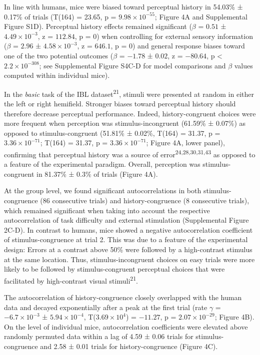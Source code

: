 \documentclass[
]{article}
\begin{document}
In line with humans, mice were biased toward perceptual history in
54.03\% ± 0.17\% of trials (T(164) = 23.65, p =
\(\ensuremath{9.98\times 10^{-55}}\); Figure 4A and Supplemental Figure
S1D). Perceptual history effects remained significant (\(\beta\) =
\(0.51\) ± \(\ensuremath{4.49\times 10^{-3}}\), z = \(112.84\), p =
\(0\)) when controlling for external sensory information (\(\beta\) =
\(2.96\) ± \(\ensuremath{4.58\times 10^{-3}}\), z = \(646.1\), p =
\(0\)) and general response biases toward one of the two potential
outcomes (\(\beta\) = \(-1.78\) ± \(0.02\), z = \(-80.64\), p < \(\ensuremath{2.2\times 10^{-308}}\);
see Supplemental Figure S4C-D for model comparisons and \(\beta\) values
computed within individual mice).

In the \emph{basic} task of the IBL dataset\textsuperscript{21}, stimuli
were presented at random in either the left or right hemifield. Stronger
biases toward perceptual history should therefore decrease perceptual
performance. Indeed, history-congruent choices were more frequent when
perception was stimulus-incongruent (61.59\% ± 0.07\%) as opposed to
stimulus-congruent (51.81\% ± 0.02\%, T(164) = 31.37, p =
\(\ensuremath{3.36\times 10^{-71}}\); T(164) = 31.37, p =
\(\ensuremath{3.36\times 10^{-71}}\); Figure 4A, lower panel),
confirming that perceptual history was a source of
error\textsuperscript{24,28,30,31,43} as opposed to a feature of the
experimental paradigm. Overall, perception was stimulus-congruent in
81.37\% ± 0.3\% of trials (Figure 4A).

At the group level, we found significant autocorrelations in both
stimulus-congruence (86 consecutive trials) and history-congruence (8
consecutive trials), which remained significant when taking into account
the respective autocorrelation of task difficulty and external
stimulation (Supplemental Figure 2C-D). In contrast to humans, mice
showed a negative autocorrelation coefficient of stimulus-congruence at
trial 2. This was due to a feature of the experimental design: Errors at
a contrast above 50\% were followed by a high-contrast stimulus at the
same location. Thus, stimulus-incongruent choices on easy trials were
more likely to be followed by stimulus-congruent perceptual choices that
were facilitated by high-contrast visual stimuli\textsuperscript{21}.

The autocorrelation of history-congruence closely overlapped with the
human data and decayed exponentially after a peak at the first trial
(rate \(\gamma\) = \(\ensuremath{-6.7\times 10^{-3}}\) ±
\(\ensuremath{5.94\times 10^{-4}}\),
T(\(\ensuremath{3.69\times 10^{4}}\)) = \(-11.27\), p =
\(\ensuremath{2.07\times 10^{-29}}\); Figure 4B). On the level of
individual mice, autocorrelation coefficients were elevated above
randomly permuted data within a lag of 4.59 ± 0.06 trials for
stimulus-congruence and 2.58 ± 0.01 trials for history-congruence
(Figure 4C).
\end{document}
